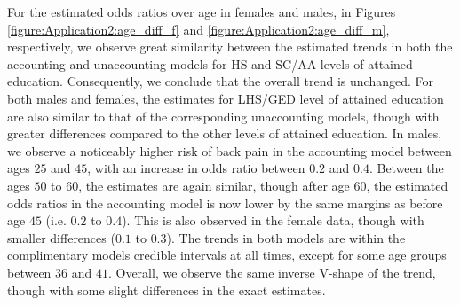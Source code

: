 \vspace{-0.2cm}
For the estimated odds ratios over age in females and males, in Figures \ref{figure:Application2:age_diff_f} and \ref{figure:Application2:age_diff_m}, respectively, we observe great similarity between the estimated trends in both the accounting and unaccounting models for HS and SC/AA levels of attained education. Consequently, we conclude that the overall trend is unchanged. For both males and females, the estimates for LHS/GED level of attained education are also similar to that of the corresponding unaccounting models, though with greater differences compared to the other levels of attained education. In males, we observe a noticeably higher risk of back pain in the accounting model between ages $25$ and $45$, with an increase in odds ratio between $0.2$ and $0.4$. Between the ages $50$ to $60$, the estimates are again similar, though after age $60$, the estimated odds ratios in the accounting model is now lower by the same margins as before age $45$ (i.e. $0.2$ to $0.4$). This is also observed in the female data, though with smaller differences ($0.1$ to $0.3$). The trends in both models are within the complimentary models credible intervals at all times, except for some age groups between $36$ and $41$. Overall, we observe the same inverse V-shape of the trend, though with some slight differences in the exact estimates.

